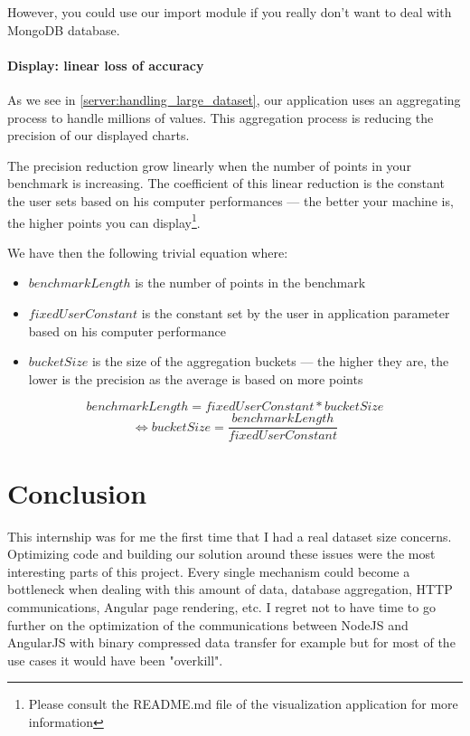 \documentclass[a4paper,11pt]{report}
\begin{document}
However, you could use our import module if you really don't want to deal with MongoDB database.

\subsubsection{Display: linear loss of accuracy}

As we see in \ref{server:handling_large_dataset}, our application uses an aggregating process to handle millions of values. This aggregation process is reducing the precision of our displayed charts.

The precision reduction grow linearly when the number of points in your benchmark is increasing. The coefficient of this linear reduction is the constant the user sets based on his computer performances --- the better your machine is, the higher points you can display\footnote{Please consult the README.md file of the visualization application for more information}. 

We have then the following trivial equation where: 
\begin{itemize}
\item
$benchmarkLength$ is the number of points in the benchmark
\item
$fixedUserConstant$ is the constant set by the user in application parameter based on his computer performance
\item
$bucketSize$ is the size of the aggregation buckets --- the higher they are, the lower is the precision as the average is based on more points
\end{itemize}

$$ benchmarkLength = fixedUserConstant * bucketSize $$
$$\Longleftrightarrow bucketSize = \frac{benchmarkLength}{fixedUserConstant} $$

\clearpage

\chapter*{Conclusion}

This internship was for me the first time that I had a real dataset size concerns. Optimizing code and building our solution around these issues were the most interesting parts of this project. Every single mechanism could become a bottleneck when dealing with this amount of data, database aggregation, HTTP communications, Angular page rendering, etc. I regret not to have time to go further on the optimization of the communications between NodeJS and AngularJS with binary compressed data transfer for example but for most of the use cases it would have been "overkill".
\end{document}
